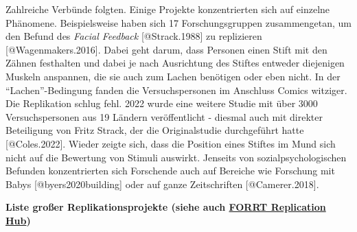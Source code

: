 \documentclass[
  letterpaper,
  DIV=11,
  numbers=noendperiod]{scrreprt}
\begin{document}
Zahlreiche Verbünde folgten. Einige Projekte konzentrierten sich auf
einzelne Phänomene. Beispielsweise haben sich 17 Forschungsgruppen
zusammengetan, um den Befund des \emph{Facial Feedback}
{[}@Strack.1988{]} zu replizieren {[}@Wagenmakers.2016{]}. Dabei geht
darum, dass Personen einen Stift mit den Zähnen festhalten und dabei je
nach Ausrichtung des Stiftes entweder diejenigen Muskeln anspannen, die
sie auch zum Lachen benötigen oder eben nicht. In der
``Lachen''-Bedingung fanden die Versuchspersonen im Anschluss Comics
witziger. Die Replikation schlug fehl. 2022 wurde eine weitere Studie
mit über 3000 Versuchspersonen aus 19 Ländern veröffentlicht - diesmal
auch mit direkter Beteiligung von Fritz Strack, der die Originalstudie
durchgeführt hatte {[}@Coles.2022{]}. Wieder zeigte sich, dass die
Position eines Stiftes im Mund sich nicht auf die Bewertung von Stimuli
auswirkt. Jenseits von sozialpsychologischen Befunden konzentrierten
sich Forschende auch auf Bereiche wie Forschung mit Babys
{[}@byers2020building{]} oder auf ganze Zeitschriften
{[}@Camerer.2018{]}.

\textbf{Liste großer Replikationsprojekte (siehe auch
\href{https://forrt.org/replication-hub/}{FORRT Replication Hub})}
\end{document}
